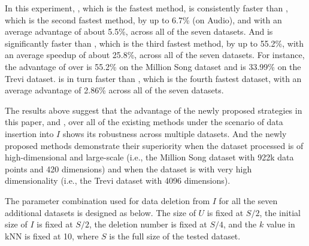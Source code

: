 In this experiment, \cpdualtree, which is the fastest method, is consistently faster than \spdualtree, which is the second fastest method, by up to 6.7\% (on Audio), and with an average advantage of about 5.5\%, across all of the seven datasets. And \spdualtree is significantly faster than \hdrtree, which is the third fastest method, by up to 55.2\%, with an average speedup of about 25.8\%, across all of the seven datasets. For instance, the advantage of \spdualtree over \hdrtree is 55.2\% on the Million Song dataset and is 33.99\% on the Trevi dataset. \hdrtree is in turn faster than \dualtree, which is the fourth fastest dataset, with an average advantage of 2.86\% across all of the seven datasets.

The results above suggest that the advantage of the newly proposed strategies in this paper, \cpdualtree and \spdualtree, over all of the existing methods under the scenario of data insertion into $I$ shows its robustness across multiple datasets. And the newly proposed methods demonstrate their superiority when the dataset processed is of high-dimensional and large-scale (i.e., the Million Song dataset with 922k data points and 420 dimensions) and when the dataset is with very high dimensionality (i.e., the Trevi dataset with 4096 dimensions).

 

The parameter combination used for data deletion from $I$ for all the seven additional datasets is designed as below. The size of $U$ is fixed at $S/2$, the initial size of $I$ is fixed at $S/2$, the deletion number is fixed at $S/4$, and the $k$ value in kNN is fixed at 10, where $S$ is the full size of the tested dataset.


